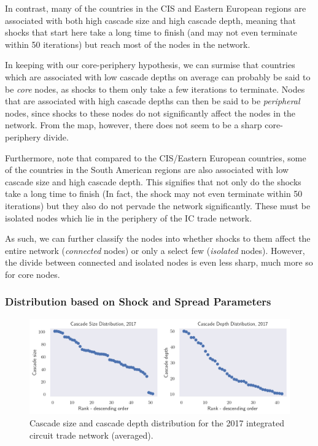 \documentclass[12pt,letterpaper]{report}
\begin{document}
				In contrast, many of the countries in the CIS and Eastern European regions are associated with both high cascade size and high cascade depth, meaning that shocks that start here take a long time to finish (and may not even terminate within 50 iterations) but reach most of the nodes in the network. 
				
				In keeping with our core-periphery hypothesis, we can surmise that countries which are associated with low cascade depths on average can probably be said to be \textit{core} nodes, as shocks to them only take a few iterations to terminate. Nodes that are associated with high cascade depths can then be said to be \textit{peripheral} nodes, since shocks to these nodes do not significantly affect the nodes in the network. From the map, however, there does not seem to be a sharp core-periphery divide.
				
				Furthermore, note that compared to the CIS/Eastern European countries, some of the countries in the South American regions are also associated with low cascade size and high cascade depth. This signifies that not only do the shocks take a long time to finish (In fact, the shock may not even terminate within 50 iterations) but they also do not pervade the network significantly. These must be isolated nodes which lie in the periphery of the IC trade network.
				
				As such, we can further classify the nodes into whether shocks to them affect the entire network (\textit{connected} nodes) or only a select few (\textit{isolated} nodes). However, the divide between connected and isolated nodes is even less sharp, much more so for core nodes.
	
			\subsubsection{Distribution based on Shock and Spread Parameters}
			\label{ssec:5312shockspread}
			
				\begin{figure}[!h]
					\centering
					\includegraphics[width=\textwidth]{Fig514-CascadeDistribution.png}
					\caption{Cascade size and cascade depth distribution for the 2017 integrated circuit trade network (averaged).}\label{fig:514CascadeDistribution}
				\end{figure}
			
\end{document}
